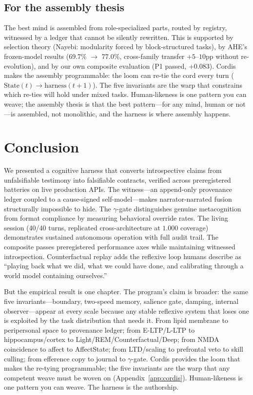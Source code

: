 \documentclass[11pt]{article}
\begin{document}
\subsection{For the assembly thesis}

The best mind is assembled from role-specialized parts, routed by
registry, witnessed by a ledger that cannot be silently rewritten. This
is supported by selection theory (Nayebi: modularity forced by
block-structured tasks), by AHE's frozen-model results (69.7\% $\to$\allowbreak{}
77.0\%, cross-family transfer $+5$--$10$pp without re-evolution), and by
our own composite evaluation (P1 passed, $+0.083$). Cordis makes the
assembly programmable: the loom can re-tie the cord every turn
($\mathrm{State}(t) \to \mathrm{harness}(t{+}1)$). The five invariants
are the warp that constrains which re-ties will hold under mixed tasks.
Human-likeness is one pattern you can weave; the assembly thesis is
that the best pattern---for any mind, human or not---is assembled, not
monolithic, and the harness is where assembly happens.

\section{Conclusion}\label{sec:conclusion}

We presented a cognitive harness that converts introspective claims from
unfalsifiable testimony into falsifiable contracts, verified across
preregistered batteries on live production APIs. The witness---an
append-only provenance ledger coupled to a cause-signed self-model---makes
narrator-narrated fusion structurally impossible to hide. The
$\gamma$-gate distinguishes genuine metacognition from format compliance
by measuring behavioral override rates. The living session (40/40
turns, replicated cross-architecture at $1.000$ coverage) demonstrates
sustained autonomous operation with full audit trail. The composite
passes preregistered performance axes while maintaining witnessed
introspection. Counterfactual replay adds the reflexive loop humans
describe as ``playing back what we did, what we could have done, and
calibrating through a world model containing ourselves.''

But the empirical result is one chapter. The program's claim is
broader: the same five invariants---boundary, two-speed memory, salience
gate, damping, internal observer---appear at every scale because any
stable reflexive system that loses one is exploited by the task
distribution that needs it. From lipid membrane to peripersonal space to
provenance ledger; from E-LTP/L-LTP to hippocampus/cortex to
Light/REM/Counterfactual/Deep; from NMDA coincidence to affect to
AffectState; from LTD/scaling to prefrontal veto to skill culling; from
efference copy to journal to $\gamma$-gate. Cordis provides the loom
that makes the re-tying programmable; the five invariants are the warp
that any competent weave must be woven on (Appendix~\ref{app:cordis}).
Human-likeness is one pattern you can weave. The harness is the
authorship.
\end{document}
